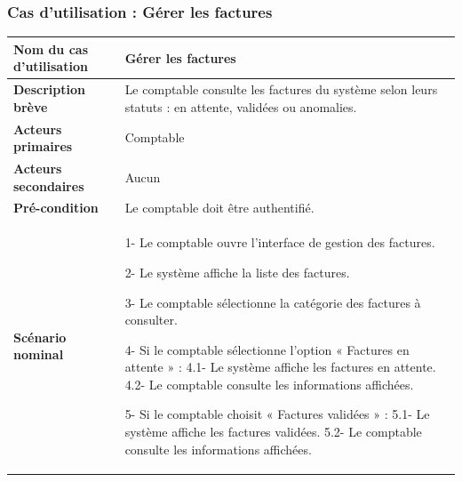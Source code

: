 \FloatBarrier

\subsubsection*{Cas d’utilisation : Gérer les factures}

\begin{table}[H]
	\centering
	\renewcommand{\arraystretch}{1.5}
	\small
	
	\begin{tabularx}{\textwidth}{|p{4.5cm}|X|}
		\hline
		\rowcolor{blue!20}
		
		\textbf{Nom du cas d’utilisation}
		& Gérer les factures \\ \hline
		
		\textbf{Description brève}
		& Le comptable consulte les factures du système selon leurs statuts : en attente, validées ou anomalies. \\ \hline
		
		\textbf{Acteurs primaires}
		& Comptable \\ \hline
		
		\textbf{Acteurs secondaires}
		& Aucun \\ \hline
		
		\textbf{Pré-condition}
		& Le comptable doit être authentifié. \\ \hline
		
		\textbf{Scénario nominal}
		&
		1- Le comptable ouvre l’interface de gestion des factures. \newline
		
		2- Le système affiche la liste des factures. \newline
		
		3- Le comptable sélectionne la catégorie des factures à consulter. \newline
		
		4- Si le comptable sélectionne l’option « Factures en attente » : \newline
		\hspace*{0.5cm}4.1- Le système affiche les factures en attente. \newline
		\hspace*{0.5cm}4.2- Le comptable consulte les informations affichées. \newline
		
		5- Si le comptable choisit « Factures validées » : \newline
		\hspace*{0.5cm}5.1- Le système affiche les factures validées. \newline
		\hspace*{0.5cm}5.2- Le comptable consulte les informations affichées. \newline
		

\end{tabularx}
\end{table}
